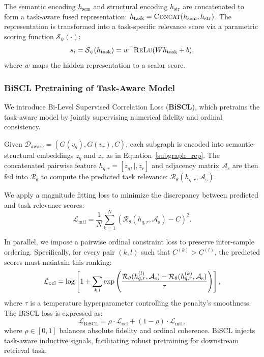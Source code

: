 \documentclass[letterpaper]{article} %
\begin{document}
The semantic encoding ${h}_{\text{sem}}$ and structural encoding ${h}_{\text{str}}$ are concatenated to form a task-aware fused representation: ${h}_{\text{task}} = \textsc{Concat}({h}_{\text{sem}}, {h}_{\text{str}})$. The representation is transformed into a task-specific relevance score via a parametric scoring function $\mathcal{S}_\psi(\cdot)$:
\begin{equation}
s_i = \mathcal{S}_\psi({h}_{\text{task}}) = {w}^\top \textsc{ReLu}({W} {h}_{\text{task}} + {b}),
\end{equation}
where ${w}$ maps the hidden representation to a scalar score.

\subsubsection{BiSCL Pretraining of Task-Aware Model}
We introduce Bi-Level Supervised Correlation Loss (\textbf{BiSCL}), which pretrains the task-aware model by jointly supervising numerical fidelity and ordinal consistency. 

Given $\mathcal{D}_{\text{aware}} = {(G(v_q), G(v_r), C)}$, each subgraph is encoded into semantic-structural embeddings ${z}_q$ and ${z}_r$ as in Equation~\ref{subgraph_rep}. The concatenated pairwise feature ${h}_{q,r} = [{z}_q , | , {z}_r]$ and adjacency matrix $\mathcal{A}_{\text{s}}$ are then fed into $\mathcal{R}_\theta$ to compute the predicted task relevance: $\mathcal{R}_\theta({h}_{q,r}, \mathcal{A}_{\text{s}})$.

We apply a magnitude fitting loss to minimize the discrepancy between predicted and task relevance scores:
\begin{equation}
\mathcal{L}_{\text{mtl}} = \frac{1}{N} \sum_{k=1}^{N} \left( \mathcal{R}_\theta({h}_{q,r}, \mathcal{A}_{\text{s}}) - C \right)^2.
\end{equation}

In parallel, we impose a pairwise ordinal constraint loss to preserve inter-sample ordering. Specifically, for every pair $(k, l)$ such that $C^{(k)} > C^{(l)}$, the predicted 
scores must maintain this ranking:
\begin{equation}
\small
\mathcal{L}_{\text{ocl}} = \log \left[ 1 + \sum_{\substack{k, l }} \exp \left( \frac{\mathcal{R}_\theta({h}_{q,r}^{(l)}, \mathcal{A}_{\text{s}}) - \mathcal{R}_\theta({h}_{q,r}^{(k)}, \mathcal{A}_{\text{s}})}{\tau} \right) \right],
\end{equation}
where $\tau$ is a temperature hyperparameter controlling the penalty's smoothness. 
The BiSCL loss is expressed as:
\begin{equation}
\mathcal{L}_{\text{BiSCL}} = \rho \cdot \mathcal{L}_{\text{ocl}} + (1 - \rho) \cdot \mathcal{L}_{\text{mtl}} ,
\end{equation}
where $\rho \in [0, 1]$ balances absolute fidelity and ordinal coherence. BiSCL injects task-aware inductive signals, facilitating robust pretraining for downstream retrieval task.
\end{document}

